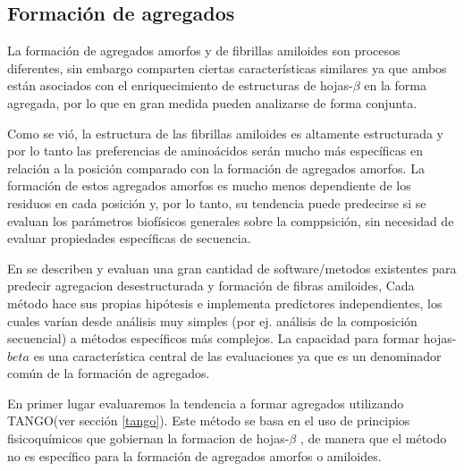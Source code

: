 \subsection{Formación de agregados}
\label{agregados}




La formación de agregados amorfos y de fibrillas amiloides son procesos diferentes, sin embargo comparten ciertas características similares ya que ambos están asociados con el enriquecimiento de estructuras de hojas-$\beta$ 
en la forma agregada, por lo que en gran medida pueden analizarse de forma conjunta.

Como se vió, la estructura de las fibrillas amiloides es altamente estructurada y por lo tanto las preferencias de aminoácidos serán mucho más específicas en relación a la posición comparado con la formación de agregados amorfos.
La formación de estos agregados amorfos es mucho menos dependiente de los residuos en cada posición y, por lo tanto, su tendencia puede predecirse si se evaluan los parámetros biofísicos generales sobre la comppsición, sin necesidad de 
evaluar propiedades específicas de secuencia.


En \cite{hamodrakas2011protein,redler2014computational,agrawal2011aggregation} se describen y evaluan una gran cantidad de software/metodos existentes para predecir agregacion desestructurada y formación de fibras amiloides, 
Cada método hace sus propias hipótesis e implementa predictores independientes, los cuales varían desde análisis muy simples (por ej. análisis de la composición secuencial) a métodos específicos más complejos.
La capacidad para formar hojas-$beta$ es una característica central de las evaluaciones ya que es un denominador común de la formación de agregados.




En primer lugar evaluaremos la tendencia a formar agregados utilizando TANGO(ver sección \ref{tango}). 
Este método se basa en el uso de principios fisicoquímicos que gobiernan la formacion de hojas-$\beta$
, de manera que el método no es específico para la formación de agregados amorfos o amiloides.



